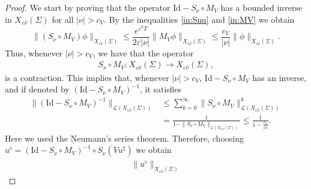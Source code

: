 \documentclass[10pt,a4paper]{amsart}
\newcommand{\R}{\mathbb{R}}
\newcommand{\tm}{\mathrm{t}}
\newcommand{\x}{\mathrm{x}}
\newcommand{\Id}{\mathrm{Id}}
\begin{document}
\begin{proof}
    We start by proving that the operator $\Id - S_\nu \circ M_V$
    has a bounded inverse in $X_{\varepsilon \hat{\nu}} (\Sigma)$ for all $|\nu| > c_V$.
By the inequalities \eqref{in:Snu} and \eqref{in:MV} we obtain
    \begin{equation*}
      \| (S_\nu \circ M_V) \phi\|_{X_{\varepsilon \hat{\nu}}(\Sigma)} \leq \frac{e^{\varepsilon^2 T}}{ 2 \varepsilon |\nu|} \|  M_V \phi\|_{X_{\varepsilon \hat{\nu}}(\Sigma)} 
      \leq \frac{c_V}{  |\nu|}  \| \phi\|_{X_{\varepsilon \hat{\nu}}(\Sigma)}.
    \end{equation*}
   Thus, whenever $|\nu|> c_V$, we have that the operator 
       \begin{align*}
   S_\nu \circ M_V:X_{\varepsilon \hat{\nu}}(\Sigma) \longrightarrow   X_{\varepsilon \hat{\nu}}(\Sigma), 
    \end{align*}
    is a contraction. This implies that, whenever $|\nu|> c_V$, $\Id - S_\nu \circ M_V$ has an inverse, and if denoted by $(\Id - S_\nu \circ M_V)^{-1}$, it satisfies
    \begin{align*}
       \| (\Id - S_\nu \circ M_V)^{-1}\|_{\mathcal{L}(X_{\varepsilon \hat{\nu}}(\Sigma))} & \leq \sum_{k=0}^\infty \|S_{\nu} \circ M_{V}\|_{\mathcal{L}(X_{\varepsilon \hat{\nu}}(\Sigma))}^k \\ 
       & = \frac{1}{1-\|S_{\nu} \circ M_{V}\|_{\mathcal{L}(X_{\varepsilon \hat{\nu}}(\Sigma))}} \leq \frac{1}{1-\frac{c_V}{  |\nu|}}.
    \end{align*}
    Here we used the Neumann's series theorem. Therefore, choosing
    $ u^\flat = (\Id - S_\nu \circ M_V)^{-1} \circ S_\nu (V u^\sharp) $
     we obtain
       \begin{align*}
 \| u^\flat \|_{X_{\varepsilon \hat{\nu}}(\Sigma)}

\end{align*}
\end{proof}
\end{document}
